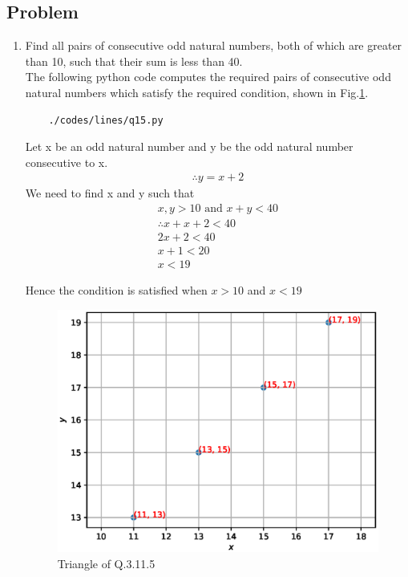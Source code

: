 \subsection{Problem}
\renewcommand{\theequation}{\theenumi}
\begin{enumerate}[label=\thesection.\arabic*.,ref=\thesection.\theenumi]
	\item Find all pairs of consecutive odd natural numbers, both of which are greater than 10, such that their sum is less than 40.\\
	The following python code computes the required pairs of consecutive odd natural numbers which satisfy the required condition, shown in Fig.\ref{fig:qfifteen}.
	\begin{lstlisting}
	./codes/lines/q15.py
	\end{lstlisting}
	
	\solution Let x be an odd natural number and y be the odd natural number consecutive to x.
	\begin{align}
	\therefore y=x+2
	\end{align}
	We need to find x and y  such that 
	\begin{align}
x,y >10 \text{ and } x+y<40\\
\therefore x+x+2<40\\
2x+2<40\\
x+1<20\\
x<19
	\end{align}
	
	
	Hence the condition is satisfied when $x>10$ and $x<19$
	
	\begin{figure}[!ht]
	\centering
	\includegraphics[width=\columnwidth]{./figs/lines/q15.eps}
	\caption{Triangle of Q.3.11.5}
	\label{fig:qfifteen}	
	\end{figure}
	
	
\end{enumerate}
